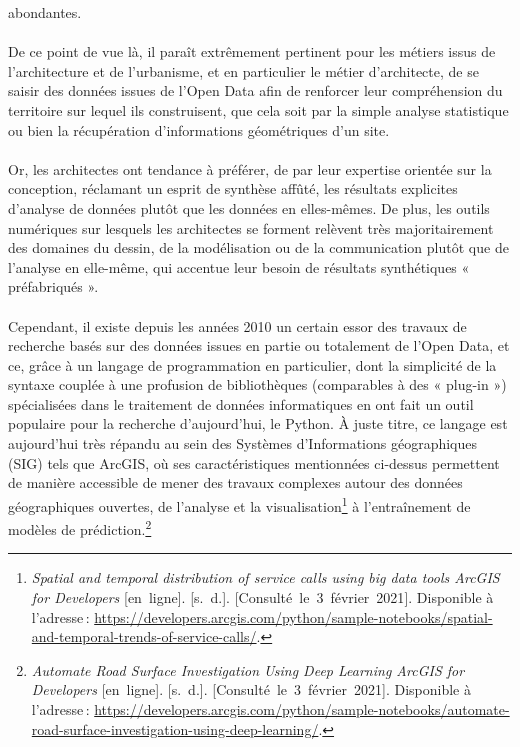 \documentclass[
  11pt,
  french,
]{article}
\begin{document}
abondantes.\\
~\\
De ce point de vue là, il paraît extrêmement pertinent pour les métiers
issus de l'architecture et de l'urbanisme, et en particulier le métier
d'architecte, de se saisir des données issues de l'Open Data afin de
renforcer leur compréhension du territoire sur lequel ils construisent,
que cela soit par la simple analyse statistique ou bien la récupération
d'informations géométriques d'un site.\\
~\\
Or, les architectes ont tendance à préférer, de par leur expertise
orientée sur la conception, réclamant un esprit de synthèse affûté, les
résultats explicites d'analyse de données plutôt que les données en
elles-mêmes. De plus, les outils numériques sur lesquels les architectes
se forment relèvent très majoritairement des domaines du dessin, de la
modélisation ou de la communication plutôt que de l'analyse en
elle-même, qui accentue leur besoin de résultats synthétiques «
préfabriqués ».\\
~\\
Cependant, il existe depuis les années 2010 un certain essor des travaux
de recherche basés sur des données issues en partie ou totalement de
l'Open Data, et ce, grâce à un langage de programmation en particulier,
dont la simplicité de la syntaxe couplée à une profusion de
bibliothèques (comparables à des « plug-in ») spécialisées dans le
traitement de données informatiques en ont fait un outil populaire pour
la recherche d'aujourd'hui, le Python. À juste titre, ce langage est
aujourd'hui très répandu au sein des Systèmes d'Informations
géographiques (SIG) tels que ArcGIS, où ses caractéristiques mentionnées
ci-dessus permettent de manière accessible de mener des travaux
complexes autour des données géographiques ouvertes, de l'analyse et la
visualisation\footnote{\emph{Spatial and temporal distribution of
  service calls using big data tools \textbar{} ArcGIS for Developers}
  {[}en~ligne{]}. {[}s.~d.{]}. {[}Consulté~le~3~février~2021{]}.
  Disponible à l'adresse\,:
  \url{https://developers.arcgis.com/python/sample-notebooks/spatial-and-temporal-trends-of-service-calls/}.}
à l'entraînement de modèles de prédiction.\footnote{\emph{Automate Road
  Surface Investigation Using Deep Learning \textbar{} ArcGIS for
  Developers} {[}en~ligne{]}. {[}s.~d.{]}.
  {[}Consulté~le~3~février~2021{]}. Disponible à l'adresse\,:
  \url{https://developers.arcgis.com/python/sample-notebooks/automate-road-surface-investigation-using-deep-learning/}.}\\
\end{document}
